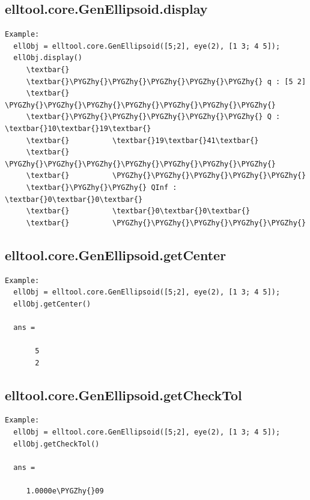 \documentclass[letterpaper,10pt,english]{sphinxmanual}
\def\PYGZhy{\char`\-}
\begin{document}
\subsection{elltool.core.GenEllipsoid.display}
\label{chap_functions:elltool-core-genellipsoid-display}
\begin{Verbatim}[commandchars=\\\{\}]
Example:
  ellObj = elltool.core.GenEllipsoid([5;2], eye(2), [1 3; 4 5]);
  ellObj.display()
     \textbar{}
     \textbar{}\PYGZhy{}\PYGZhy{}\PYGZhy{}\PYGZhy{}\PYGZhy{} q : [5 2]
     \textbar{}          \PYGZhy{}\PYGZhy{}\PYGZhy{}\PYGZhy{}\PYGZhy{}\PYGZhy{}\PYGZhy{}
     \textbar{}\PYGZhy{}\PYGZhy{}\PYGZhy{}\PYGZhy{}\PYGZhy{} Q : \textbar{}10\textbar{}19\textbar{}
     \textbar{}          \textbar{}19\textbar{}41\textbar{}
     \textbar{}          \PYGZhy{}\PYGZhy{}\PYGZhy{}\PYGZhy{}\PYGZhy{}\PYGZhy{}\PYGZhy{}
     \textbar{}          \PYGZhy{}\PYGZhy{}\PYGZhy{}\PYGZhy{}\PYGZhy{}
     \textbar{}\PYGZhy{}\PYGZhy{} QInf : \textbar{}0\textbar{}0\textbar{}
     \textbar{}          \textbar{}0\textbar{}0\textbar{}
     \textbar{}          \PYGZhy{}\PYGZhy{}\PYGZhy{}\PYGZhy{}\PYGZhy{}
\end{Verbatim}


\subsection{elltool.core.GenEllipsoid.getCenter}
\label{chap_functions:elltool-core-genellipsoid-getcenter}
\begin{Verbatim}[commandchars=\\\{\}]
Example:
  ellObj = elltool.core.GenEllipsoid([5;2], eye(2), [1 3; 4 5]);
  ellObj.getCenter()

  ans =

       5
       2
\end{Verbatim}


\subsection{elltool.core.GenEllipsoid.getCheckTol}
\label{chap_functions:elltool-core-genellipsoid-getchecktol}
\begin{Verbatim}[commandchars=\\\{\}]
Example:
  ellObj = elltool.core.GenEllipsoid([5;2], eye(2), [1 3; 4 5]);
  ellObj.getCheckTol()

  ans =

     1.0000e\PYGZhy{}09
\end{Verbatim}
\end{document}
